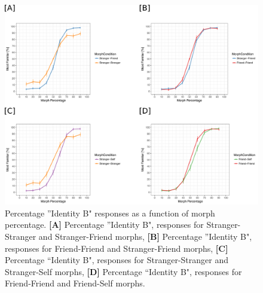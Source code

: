 \documentclass[10pt,letterpaper]{article}
\begin{document}
\begin{figure}[ht] %

\includegraphics[width=\textwidth]{final_figure4.png}

\caption{\color{Gray} Percentage ”Identity B" responses as a function of morph percentage. \textbf{[A]} Percentage ”Identity B", responses for Stranger-Stranger and Stranger-Friend morphs, \textbf{[B]} Percentage ”Identity B", responses for Friend-Friend and Stranger-Friend morphs, \textbf{[C]} Percentage “Identity B", responses for Stranger-Stranger and Stranger-Self morphs, \textbf{[D]} Percentage “Identity B", responses for Friend-Friend and Friend-Self morphs.}

\label{Figure 4} %

\end{figure}
\end{document}
